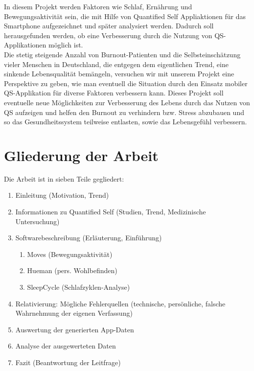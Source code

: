 In diesem Projekt werden Faktoren wie Schlaf, Ernährung und Bewegungsaktivität sein, die mit Hilfe von Quantified Self Appliaktionen für das Smartphone aufgezeichnet und später analysiert werden. %
Dadurch soll herausgefunden werden, ob eine Verbesserung durch die Nutzung von QS-Applikationen möglich ist. \\
Die stetig steigende Anzahl von Burnout-Patienten und die Selbsteinschätzung vieler Menschen in Deutschland, die entgegen dem eigentlichen Trend, eine sinkende Lebensqualität bemängeln, versuchen wir mit unserem Projekt eine Perspektive zu geben, wie man eventuell die Situation durch den Einsatz mobiler QS-Applikation für diverse Faktoren verbessern kann. 
Dieses Projekt soll eventuelle neue Möglichkeiten zur Verbesserung des Lebens durch das Nutzen von QS aufzeigen und helfen den Burnout zu verhindern bzw. Stress abzubauen und so das Gesundheitssystem teilweise entlasten, sowie das Lebensgefühl verbessern. 

\section{Gliederung der Arbeit}
\label{ch:Einleitung:sec:gliederung-der-arbeit}

Die Arbeit ist in sieben Teile gegliedert:

\begin{enumerate}
\def\labelenumi{\arabic{enumi}.}
\itemsep1pt\parskip0pt
\item
  Einleitung (Motivation, Trend)
\item
  Informationen zu Quantified Self (Studien, Trend, Medizinische
  Untersuchung)
\item
  Softwarebeschreibung (Erläuterung, Einführung)

  \begin{enumerate}
  \def\labelenumii{\alph{enumii}.}
  \itemsep1pt\parskip0pt
  \item
    Moves (Bewegungsaktivität)\\
  \item
    Hueman (pers. Wohlbefinden)\\
  \item
    SleepCycle (Schlafzyklen-Analyse)
  \end{enumerate}
\item
  Relativierung: Mögliche Fehlerquellen (technische, persönliche,
  falsche Wahrnehmung der eigenen Verfassung)
\item
  Auswertung der generierten App-Daten
\item
  Analyse der ausgewerteten Daten
\item
  Fazit (Beantwortung der Leitfrage)
\end{enumerate}

